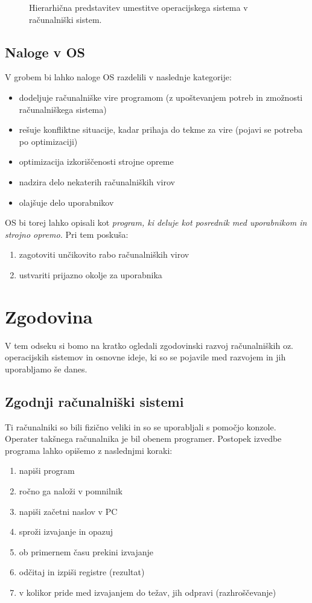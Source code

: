 \documentclass[
  slovene,
  a4paper
]{book}
\begin{document}
\begin{figure}
  \centering
  
  \caption{Hierarhična predstavitev umestitve operacijskega sistema v računalniški sistem.}
  \label{002-usklajevanje}
\end{figure}


\subsection{Naloge v OS}

V grobem bi lahko naloge OS razdelili v naslednje kategorije:
\begin{itemize}
  \item dodeljuje računalniške vire programom (z upoštevanjem potreb in zmožnosti računalniškega sistema)
  \item rešuje konfliktne situacije, kadar prihaja do tekme za vire (pojavi se potreba po optimizaciji)
  \item optimizacija izkoriščenosti strojne opreme
  \item nadzira delo nekaterih računalniških virov
  \item olajšuje delo uporabnikov
\end{itemize}

OS bi torej lahko opisali kot \emph{program, ki deluje kot posrednik med uporabnikom in strojno opremo.} Pri tem poskuša:
\begin{enumerate}
  \item zagotoviti unčikovito rabo računalniških virov
  \item ustvariti prijazno okolje za uporabnika
\end{enumerate}


\section{Zgodovina}

V tem odseku si bomo na kratko ogledali zgodovinski razvoj računalniških oz. operacijskih sistemov in osnovne ideje, ki so se pojavile med razvojem in jih uporabljamo še danes.


\subsection{Zgodnji računalniški sistemi}

Ti računalniki so bili fizično veliki in so se uporabljali s pomočjo konzole. Operater takšnega računalnika je bil obenem programer. Postopek izvedbe programa lahko opišemo z naslednjmi koraki:
\begin{enumerate}
  \item napiši program
  \item ročno ga naloži v pomnilnik
  \item napiši začetni naslov v PC
  \item sproži izvajanje in opazuj
  \item ob primernem času prekini izvajanje
  \item odčitaj in izpiši registre (rezultat)
  \item v kolikor pride med izvajanjem do težav, jih odpravi (razhroščevanje)
\end{enumerate}
\end{document}
